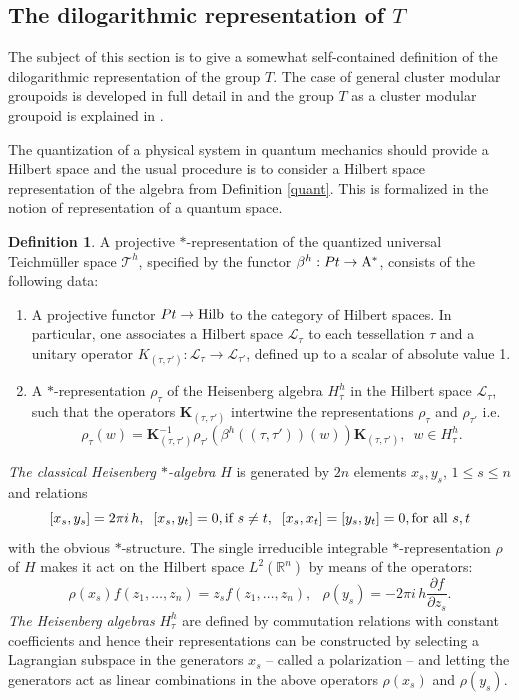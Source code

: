 \documentclass[twoside]{irmaems}
\theoremstyle{plain}
\theoremstyle{definition}
\newtheorem{definition}{Definition}[section]
\theoremstyle{remark}
\newcommand{\R}{{\mathbb{R}}}
\begin{document}
\subsection{The dilogarithmic representation of $T$}\label{dilog}
The subject of this section is to give a somewhat 
self-contained definition of the 
dilogarithmic representation of the group $T$. The case of general  cluster modular groupoids 
is developed in full detail in \cite{FG,FG3} and the group $T$ as a cluster modular groupoid 
is explained in \cite{FG2}.  

\vspace{0.2cm}
\noindent 
The quantization of a physical system in quantum mechanics should provide a Hilbert space 
and the usual procedure is to consider a Hilbert space representation of the algebra 
from Definition \ref{quant}. This is formalized in the notion of 
representation of a quantum space. 

\vspace{0.2cm}
\noindent 
\begin{definition}\label{repre} 
A projective $*$-representation 
of the quantized universal Teichm\"uller space ${\mathcal T}^h$,  
specified by the functor $\beta^h:Pt\to {\rm A}^*$,  
consists of the following data: 
\begin{enumerate}
\item A projective functor $Pt\to {\rm Hilb}$ to the category of Hilbert spaces. In particular, 
one associates a Hilbert space ${\mathcal L}_{\tau}$ to each tessellation $\tau$ and 
a unitary operator $K_{(\tau,\tau')}:{\mathcal L}_{\tau}\to {\mathcal L}_{\tau'}$, defined 
up to a scalar of absolute value 1.  
\item A $*$-representation $\rho_{\tau}$ of the Heisenberg algebra $H_{\tau}^h$ 
in the Hilbert space ${\mathcal L}_{\tau}$, such that the operators ${\mathbf K}_{(\tau,\tau')}$ 
intertwine the representations  $\rho_{\tau}$ and  $\rho_{\tau'}$ i.e.
\[   \rho_{\tau}(w)= {\mathbf K}_{(\tau,\tau')}^{-1} \rho_{\tau'}\left(\beta^h((\tau,\tau'))(w)\right)
{\mathbf K}_{(\tau,\tau')}, \,\,\, w\in H_{\tau}^h.\]
\end{enumerate}
\end{definition}

\vspace{0.2cm}
\noindent 
{\em The classical Heisenberg $*$-algebra}  $H$ is generated by $2n$ elements 
$x_s,y_s$, $1\leq s\leq n$ and relations 
\[ [x_s, y_s]=2\pi i \, h, \;\; [x_s,y_t]=0, \mbox{\rm if } s\neq t, \;\; [x_s, x_t]=[y_s,y_t]=0, \mbox{\rm for all } s, t\] 
with the obvious $*$-structure. 
The single irreducible integrable $*$-representation 
$\rho$ of $H$ makes it act   
 on the Hilbert space $L^2(\R^n)$ by means of the operators:  
\[ \rho(x_s)f(z_1,\ldots,z_n)= z_sf(z_1,\ldots,z_n) , \;\;\, \rho(y_s)=-2\pi i \, h \frac{\partial f}{\partial z_s}. \]
{\em The Heisenberg algebras} $H_{\tau}^h$  are defined by commutation relations with 
constant coefficients and hence their representations can be constructed 
by selecting a Lagrangian subspace in the generators $x_s$   --  called a polarization  -- 
and letting the generators act as linear combinations in the above 
operators $\rho(x_s)$ and $\rho(y_s)$. 
\end{document}
